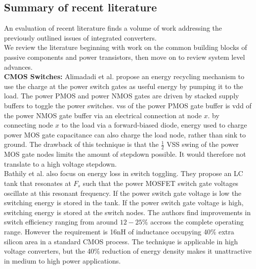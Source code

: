 \documentclass[letterpaper,twocolumn,10pt]{article}
\begin{document}

\subsection{Summary of recent literature}
An evaluation of recent literature finds a volume of work addressing the previously outlined issues of integrated converters.\\
We review the literature beginning with work on the common building blocks of passive components and power transistors, then move on to review system level advances.\\ 
\textbf{CMOS Switches: }Alimadadi et al.\cite{Alimadadi2008} propose an energy recycling mechanism to use the charge at the power switch gates as useful energy by pumping it to the load. The power PMOS and power NMOS gates are driven by stacked supply buffers to toggle the power switches. vss of the power PMOS gate buffer is vdd of the power NMOS gate buffer via an electrical connection at node $x$. by connecting node $x$ to the load via a forward-biased diode, energy used to charge power MOS gate capacitance can also charge the load node, rather than sink to ground. The drawback of this technique is that the $\frac{1}{2}$ VSS swing of the power MOS gate nodes limits the amount of stepdown possible. It would therefore not translate to a high voltage stepdown.\\
\indent Bathily et al.\cite{Bathily2012} also focus on energy loss in switch toggling. They propose an LC tank that resonates at $F_s$ such that the power MOSFET switch gate voltages oscillate at this resonant frequency. If the power switch gate voltage is low the switching energy is stored in the tank. If the power switch gate voltage is high, switching energy is stored at the switch nodes. The authors find improvements in switch efficiency ranging from around $12 - 25\%$ accross the complete operating range. However the requirement is 16nH of inductance occupying 40\% extra silicon area in a standard CMOS process. The technique is applicable in high voltage converters, but the 40\% reduction of energy density makes it unattractive in medium to high power applications.
\end{document}
